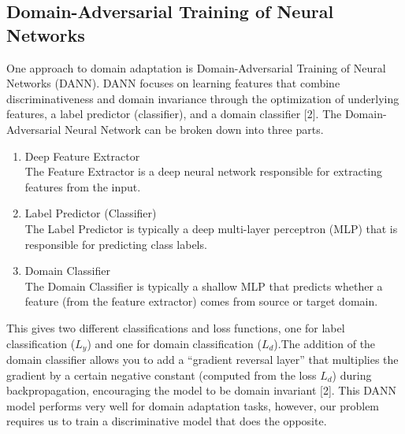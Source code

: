 \documentclass[12pt]{article}
\begin{document}
\subsection*{Domain-Adversarial Training of Neural Networks}
One approach to domain adaptation is Domain-Adversarial Training of Neural Networks (DANN). DANN focuses on learning features that combine discriminativeness and domain invariance through the optimization of underlying features, a label predictor (classifier), and a domain classifier [2]. The Domain-Adversarial Neural Network can be broken down into three parts. 
\begin{enumerate}
  \item Deep Feature Extractor\\
  The Feature Extractor is a deep neural network responsible for extracting features from the input.
  \item Label Predictor (Classifier) \\ The Label Predictor is typically a deep multi-layer perceptron (MLP) that is responsible for predicting class labels.
  \item Domain Classifier\\
  The Domain Classifier is typically a shallow MLP that predicts whether a feature (from the feature extractor) comes from source or target domain.
\end{enumerate}
This gives two different classifications and loss functions, one for label classification ($L_y$) and one for domain classification ($L_d$).The addition of the domain classifier allows you to add a ``gradient reversal layer'' that multiplies the gradient by a certain negative constant (computed from the loss $L_d$) during backpropagation, encouraging the model to be domain invariant [2]. This DANN model performs very well for domain adaptation tasks, however, our problem requires us to train a discriminative model that does the opposite.
\end{document}
